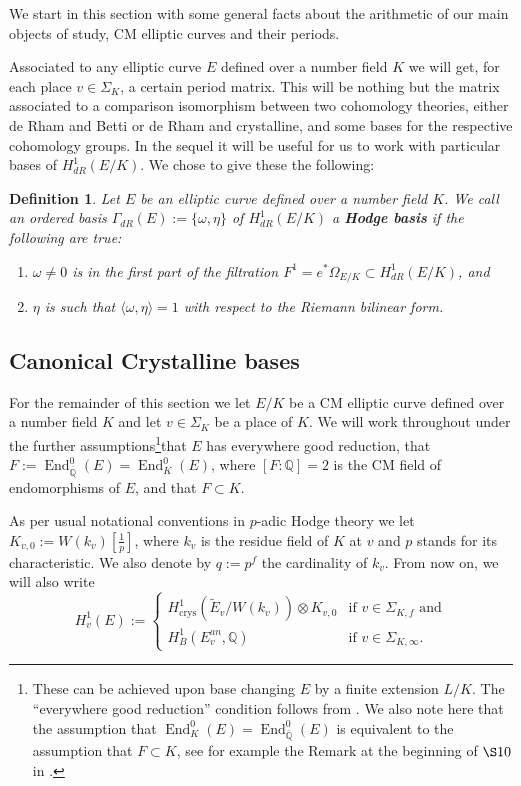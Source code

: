 \documentclass[12pt,twoside,a4paper]{article}
\theoremstyle{plain}%
\newtheorem{definition}[theorem]{Definition} %
\DeclareMathOperator{\End}{End}
\DeclareMathOperator{\crys}{crys}
\newcommand{\Q}{\mathbb{Q}}
\begin{document}
We start in this section with some general facts about the arithmetic of our main objects of study, CM elliptic curves and their periods.

Associated to any elliptic curve $E$ defined over a number field $K$ we will get, for each place $v\in\Sigma_{K}$, a certain period matrix. This will be nothing but the matrix associated to a comparison isomorphism between two cohomology theories, either de Rham and Betti or de Rham and crystalline, and some bases for the respective cohomology groups. In the sequel it will be useful for us to work with particular bases of $H^1_{dR}(E/K)$. We chose to give these the following:
\begin{definition}\label{hodgebasis}Let $E$ be an elliptic curve defined over a number field $K$.  We call an ordered basis $\Gamma_{dR}(E):=\{\omega,\eta\}$ of $H^1_{dR}(E/K)$ a \textbf{Hodge basis} if the following are true:
	\begin{enumerate}
		\item $\omega\neq 0$ is in the first part of the filtration $F^1=e^{*}\Omega_{E/K}\subset H^1_{dR}(E/K)$, and 
		
		\item $\eta$ is such that $\langle \omega,\eta\rangle=1$ with respect to the Riemann bilinear form.
	\end{enumerate}
\end{definition}

\subsection{Canonical Crystalline bases}\label{section:bases}

For the remainder of this section we let  $E/K$ be a CM elliptic curve defined over a number field $K$ and let $v\in \Sigma_{K}$ be a place of $K$. We will work throughout under the further assumptions\footnote{These can be achieved upon base changing $E$ by a finite extension $L/K$. The ``everywhere good reduction'' condition follows from \cite{serretate}. We also note here that the assumption that $\End^{0}_K(E)=\End^0_{\bar{\Q}}(E)$ is equivalent to the assumption that $F\subset K$, see for example the Remark at the beginning of $\S 10$ in \cite{langellfuns}.}that $E$ has everywhere good reduction, that $F:=\End_{\bar{\Q}}^{0}(E)=\End_{K}^{0}(E)$, where $[F:\Q]=2$ is the CM field of endomorphisms of $E$, and that $F\subset K$. 

As per usual notational conventions in $p$-adic Hodge theory we let $K_{v,0}:=W(k_v)[\frac{1}{p}]$, where $k_v$ is the residue field of $K$ at $v$ and $p$ stands for its characteristic. We also denote by $q:=p^f$ the cardinality of $k_v$. From now on, we will also write \begin{equation}
		H^1_v(E):= \begin{cases}H^1_{\crys}(\tilde{E}_v/W(k_v))\otimes K_{v,0}& \text{if }v\in\Sigma_{K,f} \text{ and} \\
H^1_{B}(E_v^{an},\Q)& \text{if } v\in\Sigma_{K,\infty}. 
		\end{cases}
\end{equation}
\end{document}
